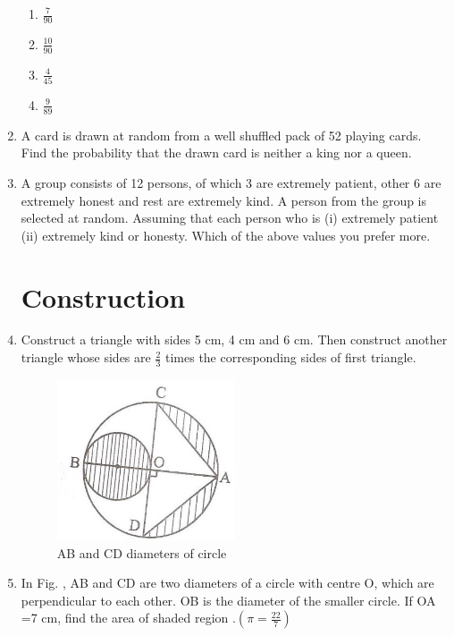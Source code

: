 \documentclass[10pt,-letter paper]{article}
\providecommand{\brak}[1]{\ensuremath{\left(#1\right)}}
\begin{document}
\begin{enumerate}
 \begin{enumerate}
    \item $\frac{7}{90}$\\
    \item $\frac{10}{90}$\\
    \item $\frac{4}{45}$\\
    \item $\frac{9}{89}$
 \end{enumerate}


\item A card is drawn at random from a well shuffled pack of 52 playing cards. Find the probability that the drawn card is neither a king nor a queen.

\item A group consists of 12 persons, of which 3 are extremely patient, other 6 are extremely honest and rest are extremely kind. A person from the group is selected at random. Assuming that each person who is (i) extremely patient (ii) extremely kind or honesty. Which of the above values you prefer more.
 \section{Construction}
\item Construct a triangle with sides 5 cm, 4 cm and 6 cm. Then construct another triangle whose sides are $\frac{2}{3}$ times the corresponding sides of first triangle.
\begin{figure}[H]
		\centering
\includegraphics[width=\columnwidth]{6.png}
\caption{AB and CD diameters of circle}
\label{fig:fig6}
	\end{figure}
\item In Fig. , AB and CD are two diameters of a circle with centre O, which are perpendicular to each other. OB is the diameter of the smaller circle. If OA =7 cm, find the area of shaded region .$\brak{ \pi = \frac{22}{7}}$\\
	

\end{enumerate}
\end{document}

